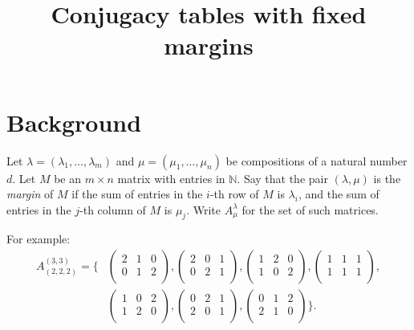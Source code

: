 \documentclass[11pt]{article} %
\title{Conjugacy tables with fixed margins}
\date{} %
\begin{document}
\maketitle

\section{Background}

Let $\lambda = (\lambda_1, \ldots, \lambda_m)$  and $\mu = (\mu_1, \ldots, \mu_n)$ be compositions of a natural number $d$. Let $M$ be an $m \times n$ matrix with entries in $\mathbb{N}$. Say that the pair $(\lambda, \mu)$ is the {\em margin} of $M$ if the sum of entries in the $i$-th row of $M$ is $\lambda_i$, and the sum of entries in the $j$-th column of $M$ is $\mu_j$.
Write $A^{\lambda}_{\mu}$ for the set of such matrices. 

For example:
\begin{align*}
A^{(3,3)}_{(2,2,2)} 
= \{
&
\begin{pmatrix}
    2 & 1 & 0 \\
    0 & 1 & 2\\
  \end{pmatrix}
,
\begin{pmatrix}
    2 & 0 & 1 \\
    0 & 2 & 1\\
  \end{pmatrix}
,
\begin{pmatrix}
    1 & 2 & 0 \\
    1 & 0 & 2\\
  \end{pmatrix}
,
\begin{pmatrix}
    1 & 1 & 1 \\
    1 & 1 & 1\\
  \end{pmatrix}
, \\
& 
\begin{pmatrix}
    1 & 0 & 2 \\
    1 & 2 & 0\\
  \end{pmatrix}
,
\begin{pmatrix}
    0 & 2 & 1 \\
    2 & 0 & 1\\
  \end{pmatrix}
,
\begin{pmatrix}
    0 & 1 & 2 \\
    2 & 1 & 0\\
  \end{pmatrix}
\}.
\end{align*}
\end{document}
